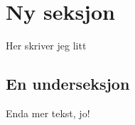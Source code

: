 \section{Ny seksjon}

Her skriver jeg litt \\

\subsection{En underseksjon}

Enda mer tekst, jo! \\

